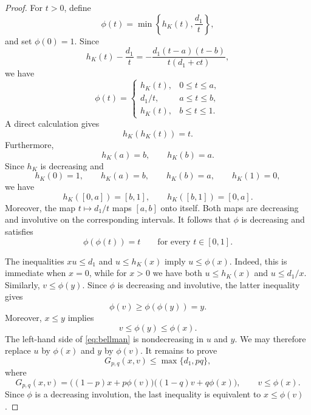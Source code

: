 \documentclass[11pt]{article}
\numberwithin{equation}{section}
\theoremstyle{definition}
\theoremstyle{remark}
\begin{document}
\begin{proof}
For $t>0$, define
\begin{equation*}
 \phi(t)=\min\left\{h_K(t),\frac{d_1}{t}\right\},
\end{equation*}
and set $\phi(0)=1$. Since
\begin{equation*}
 h_K(t)-\frac{d_1}{t}
 =
 -\frac{d_1(t-a)(t-b)}
        {t(d_1+ct)},
\end{equation*}
we have
\begin{equation}
 \phi(t)=
 \begin{cases}
  h_K(t),&0\leq t\leq a,\\[2pt]
  d_1/t,&a\leq t\leq b,\\[2pt]
  h_K(t),&b\leq t\leq1.
 \end{cases}
 \label{eq:phi-pieces}
\end{equation}
A direct calculation gives
\begin{equation*}
 h_K(h_K(t))=t.
\end{equation*}
Furthermore,
\begin{equation*}
 h_K(a)=b,
 \qquad
 h_K(b)=a.
\end{equation*}
Since $h_K$ is decreasing and
\begin{equation*}
 h_K(0)=1,
 \qquad
 h_K(a)=b,
 \qquad
 h_K(b)=a,
 \qquad
 h_K(1)=0,
\end{equation*}
we have
\begin{equation*}
 h_K([0,a])=[b,1],
 \qquad
 h_K([b,1])=[0,a].
\end{equation*}
Moreover, the map $t\mapsto d_1/t$ maps $[a,b]$ onto itself. Both maps are decreasing
and involutive on the corresponding intervals. It follows that
$\phi$ is decreasing and satisfies
\begin{equation*}
 \phi(\phi(t))=t
 \qquad\text{for every }t\in[0,1].
\end{equation*}

The inequalities $xu\leq d_1$ and $u\leq h_K(x)$ imply
$
 u\leq\phi(x).
$
Indeed, this is immediate when $x=0$, while for $x>0$ we have both
$u\leq h_K(x)$ and $u\leq d_1/x$. Similarly,
$
 v\leq\phi(y).
$
Since $\phi$ is decreasing and involutive, the latter inequality gives
\begin{equation*}
 \phi(v)\geq\phi(\phi(y))=y.
\end{equation*}
Moreover, $x\leq y$ implies
\begin{equation*}
 v\leq\phi(y)\leq\phi(x).
\end{equation*}
The left-hand side of \eqref{eq:bellman} is nondecreasing in $u$ and
$y$. We may therefore replace $u$ by $\phi(x)$ and $y$ by $\phi(v)$.
It remains to prove
\begin{equation*}
 G_{p,q}(x,v)\leq\max\{d_1,pq\},
\end{equation*}
where
\begin{equation*}
 G_{p,q}(x,v)
 =
 \bigl((1-p)x+p\phi(v)\bigr)
 \bigl((1-q)v+q\phi(x)\bigr),\qquad v\leq\phi(x).
\end{equation*}
Since $\phi$ is a decreasing involution, the last inequality is
equivalent to $x\leq\phi(v)$.



\end{proof}
\end{document}
